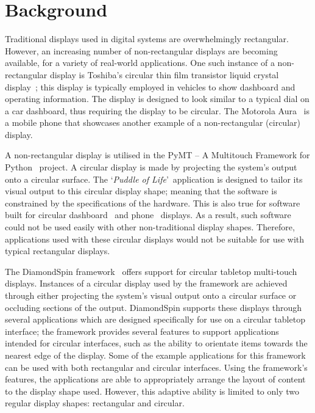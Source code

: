 \documentclass[twocolumn,compsoc]{cvm}
\begin{document}
\section*{Background}
\label{sec:related}

Traditional displays used in digital systems are overwhelmingly rectangular.
However, an increasing number of non-rectangular displays are becoming available, for a variety of real-world applications.
One such instance of a non-rectangular display is Toshiba's circular
thin film transistor liquid crystal display~\cite{Boyd2007}; this display is typically employed in vehicles to show dashboard and operating information.
The display is designed to look similar to a typical dial on a car dashboard, thus requiring the display to be circular.
The Motorola Aura~\cite{Finney2009} is a mobile phone that showcases another example of a non-rectangular (circular) display.

A non-rectangular display is utilised in the PyMT -- A Multitouch Framework for Python~\cite{Hansen2009} project.
A circular display is made by projecting the system's output onto a circular surface.
The \lq {\emph{Puddle of Life}}\rq\ application is designed to tailor its visual output to this circular display shape; meaning that the software is constrained by the specifications of the hardware.
This is also true for software built for circular dashboard~\cite{Boyd2007} and phone~\cite{Finney2009} displays.
As a result, such software could not be used easily with other non-traditional display shapes.
Therefore, applications used with these circular displays would not be suitable for use with typical rectangular displays.

The DiamondSpin framework~\cite{Shen2004} offers support for circular tabletop multi-touch displays.
Instances of a circular display used by the framework are achieved through either projecting the system's visual output onto a circular surface or occluding sections of the output.
DiamondSpin supports these displays through several applications which are designed specifically for use on a circular tabletop interface; the framework provides several features to support applications intended for circular interfaces, such as the ability to orientate items towards the nearest edge of the display.
Some of the example applications for this framework can be used with both rectangular and circular interfaces.
Using the framework's features, the applications are able to appropriately arrange the layout of content to the display shape used.
However, this adaptive ability is limited to only two regular display shapes: rectangular and circular.
\end{document}
